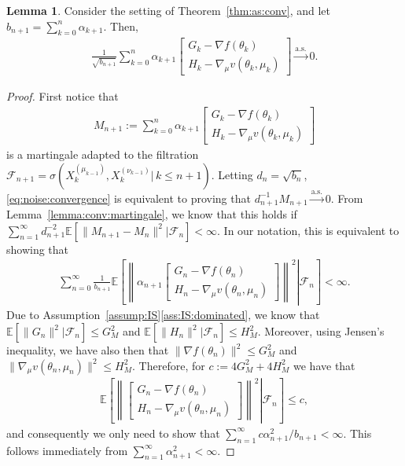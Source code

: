 \documentclass[11pt,a4paper]{article}
\theoremstyle{definition}
\newtheorem{lemma}[theorem]{Lemma}
\begin{document}
\begin{lemma}
\label{lemma:noise:convergence}
Consider the setting of Theorem~\ref{thm:as:conv}, and let $b_{n+1} = \sum_{k=0}^n \alpha_{k+1}$. Then, 
\begin{align}
\label{eq:noise:convergence}
    \frac{1}{\sqrt{b_{n+1}}}\sum_{k=0}^n \alpha_{k+1}\begin{bmatrix}G_k - \nabla {f}(\theta_k) \\ H_k - \nabla_\mu v(\theta_k,\mu_k)\end{bmatrix} \overset{\text{a.s.}}{\to} 0.
\end{align}
\end{lemma}
\begin{proof}
First notice that 
\begin{align*}
    M_{n+1} := \sum_{k=0}^{n} \alpha_{k+1}\begin{bmatrix}G_k - \nabla {f}(\theta_k) \\ H_k - \nabla_\mu v(\theta_k,\mu_k)\end{bmatrix}
\end{align*}
is a martingale adapted to the filtration $\mathcal F_{n+1} = \sigma(X_k^{(\mu_{k-1})}, X_k^{(\nu_{k-1})} |\, k \leq n+1)$. Letting $d_{n} = \sqrt{b_{n}}$, \eqref{eq:noise:convergence} is equivalent to proving that $d_{n+1}^{-1} M_{n+1}  \overset{\text{a.s.}}{\to} 0$. From Lemma~\ref{lemma:conv:martingale}, we know that this holds if $\sum_{n=1}^\infty d_{n+1}^{-2} \mathbb E[\|M_{n+1}-M_{n}\|^2 | \mathcal F_{n}] < \infty$. In our notation, this is equivalent to showing that
\begin{align*}
    \sum_{n=0}^\infty \frac{1}{b_{n+1}} \mathbb E \left.\left[\left\|\alpha_{n+1} \begin{bmatrix}G_n - \nabla {f}(\theta_n) \\ H_n - \nabla_\mu v(\theta_n,\mu_n)\end{bmatrix} \right\|^2 \right| \mathcal F_{n}  \right] < \infty.
\end{align*}
Due to Assumption~\ref{assump:IS}\ref{ass:IS:dominated}, we know that $\mathbb E[\|G_n\|^2 | \mathcal F_n] \leq G_M^2$ and $\mathbb E[\|H_n\|^2 | \mathcal F_n] \leq H_M^2$. Moreover, using Jensen's inequality, we have also then that $\|\nabla {f}(\theta_n)\|^2 \leq G_M^2$ and $\|\nabla_\mu v(\theta_n,\mu_n)\|^2 \leq H_M^2$. Therefore, for $c:=4G_M^2 + 4H_M^2$ we have that 
\begin{align*}
    \mathbb E \left.\left[\left\| \begin{bmatrix}G_n - \nabla {f}(\theta_n) \\ H_n - \nabla_\mu v(\theta_n,\mu_n)\end{bmatrix} \right\|^2 \right| \mathcal F_{n}  \right] \leq c,
\end{align*}
and consequently we only need to show that $\sum_{n=1}^\infty c {\alpha_{n+1}^2}/{b_{n+1}} < \infty$. This follows immediately from $\sum_{n=1}^\infty {\alpha_{n+1}^2} < \infty$.
\end{proof}
\end{document}
